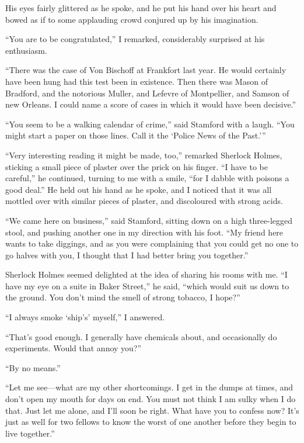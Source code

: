 \documentclass[12pt,english,oneside]{book}
\newcommand{\mdsh}[1]{\mbox{#1}\linebreak[1]}
\begin{document}
His eyes fairly glittered as he spoke, and he put his hand over his
heart and bowed as if to some applauding crowd conjured up by his
imagination.

{}``You are to be congratulated,'' I remarked, considerably surprised
at his enthusiasm.

{}``There was the case of Von Bischoff at Frankfort last year. He
would certainly have been hung had this test been in existence. Then
there was Mason of Bradford, and the notorious Muller, and Lefevre
of Montpellier, and Samson of new Orleans. I could name a score of
cases in which it would have been decisive.''

{}``You seem to be a walking calendar of crime,'' said Stamford
with a laugh. {}``You might start a paper on those lines. Call it
the `Police News of the Past.'''

{}``Very interesting reading it might be made, too,'' remarked Sherlock
Holmes, sticking a small piece of plaster over the prick on his finger.
{}``I have to be careful,'' he continued, turning to me with a smile,
{}``for I dabble with poisons a good deal.'' He held out his hand
as he spoke, and I noticed that it was all mottled over with similar
pieces of plaster, and discoloured with strong acids.

{}``We came here on business,'' said Stamford, sitting down on a
high three-legged stool, and pushing another one in my direction with
his foot. {}``My friend here wants to take diggings, and as you were
complaining that you could get no one to go halves with you, I thought
that I had better bring you together.''

Sherlock Holmes seemed delighted at the idea of sharing his rooms
with me. {}``I have my eye on a suite in Baker Street,'' he said,
{}``which would suit us down to the ground. You don't mind the smell
of strong tobacco, I hope?''

{}``I always smoke `ship's' myself,'' I answered.

{}``That's good enough. I generally have chemicals about, and occasionally
do experiments. Would that annoy you?''

{}``By no means.''

{}``Let me see\mdsh{---}what are my other shortcomings. I get in
the dumps at times, and don't open my mouth for days on end. You must
not think I am sulky when I do that. Just let me alone, and I'll soon
be right. What have you to confess now? It's just as well for two
fellows to know the worst of one another before they begin to live
together.''
\end{document}
